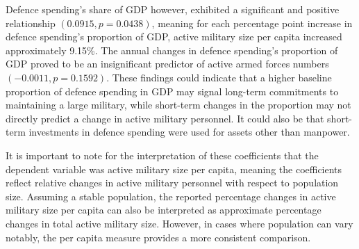 Defence spending's share of GDP however, exhibited 
a significant and positive relationship $(0.0915, p=0.0438)$, meaning for each percentage point increase in defence spending's 
proportion of GDP, active military size per capita increased approximately 9.15\%.
The annual changes in defence spending's proportion of GDP proved to be an insignificant predictor
of active armed forces numbers $(-0.0011, p=0.1592)$. 
These findings could indicate that a higher baseline proportion of defence 
spending in GDP may signal long-term commitments to maintaining a large military, while short-term 
changes in the proportion may not directly predict a change in active military personnel. It could 
also be that short-term investments in defence spending were used for assets other than manpower.

It is important to note for the interpretation of these coefficients that the dependent variable was 
active military size per capita, meaning the coefficients reflect relative changes in active military personnel 
with respect to population size. Assuming a stable population, the reported percentage changes 
in active military size per capita can also be interpreted as approximate percentage changes in total 
active military size. However, in cases where population can vary notably, the per capita measure provides 
a more consistent comparison.